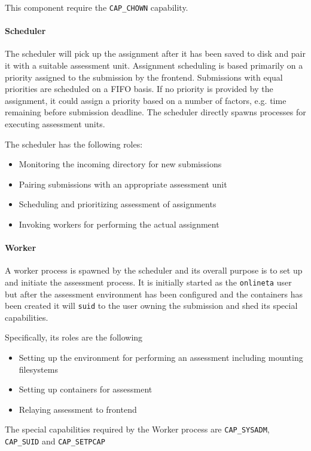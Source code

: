 This component require the \texttt{CAP\_CHOWN} capability.

\paragraph{Scheduler}
The scheduler will pick up the assignment after it has been saved to
disk and pair it with a suitable assessment unit. Assignment
scheduling is based primarily on a priority assigned to the submission
by the frontend. Submissions with equal priorities are scheduled on a
FIFO basis. If no priority is provided by the assignment, it could
assign a priority based on a number of factors, e.g. time remaining
before submission deadline. The scheduler directly spawns processes for
executing assessment units.

The scheduler has the following roles:
\begin{itemize}
\item Monitoring the incoming directory for new submissions
\item Pairing submissions with an appropriate assessment unit
\item Scheduling and prioritizing assessment of assignments
\item Invoking workers for performing the actual assignment
\end{itemize}

\paragraph{Worker}
A worker process is spawned by the scheduler and its overall purpose
is to set up and initiate the assessment process. It is initially
started as the \texttt{onlineta} user but after the assessment
environment has been configured and the containers has been created it
will \texttt{suid} to the user owning the submission and shed its special
capabilities.

Specifically, its roles are the following
\begin{itemize}
\item Setting up the environment for performing an assessment
  including mounting filesystems
\item Setting up containers for assessment
\item Relaying assessment to frontend
\end{itemize}

The special capabilities required by the Worker process are
\texttt{CAP\_SYSADM}, \texttt{CAP\_SUID} and \texttt{CAP\_SETPCAP}

